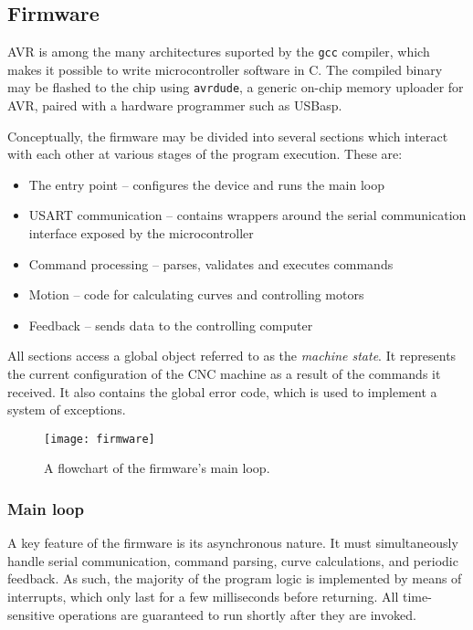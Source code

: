 \subsection{Firmware}

AVR is among the many architectures suported by the \texttt{gcc} compiler,
which makes it possible to write microcontroller software in C. The compiled
binary may be flashed to the chip using \texttt{avrdude}, a generic
on-chip memory uploader for AVR, paired with a hardware programmer such as
USBasp.

Conceptually, the firmware may be divided into several sections which interact
with each other at various stages of the program execution. These are:
\begin{itemize}
    \item The entry point -- configures the device and runs the main loop
    \item USART communication -- contains wrappers around the serial
    communication interface exposed by the microcontroller
    \item Command processing -- parses, validates and executes commands
    \item Motion -- code for calculating curves and controlling motors
    \item Feedback -- sends data to the controlling computer
\end{itemize}
All sections access a global object referred to as the \textit{machine state}.
It represents the current configuration of the CNC machine as a result of the
commands it received. It also contains the global error code, which is used to
implement a system of exceptions.

\begin{figure}[ht]
    \begin{center}
        \texttt{[image: firmware]}
        \caption{A flowchart of the firmware's main loop.}
        \label{firmware}
    \end{center}
\end{figure}

\subsubsection{Main loop}

A key feature of the firmware is its asynchronous nature. It must simultaneously
handle serial communication, command parsing, curve calculations, and periodic
feedback. As such, the majority of the program logic is implemented by means of
interrupts, which only last for a few milliseconds before returning. All
time-sensitive operations are guaranteed to run shortly after they are invoked.

